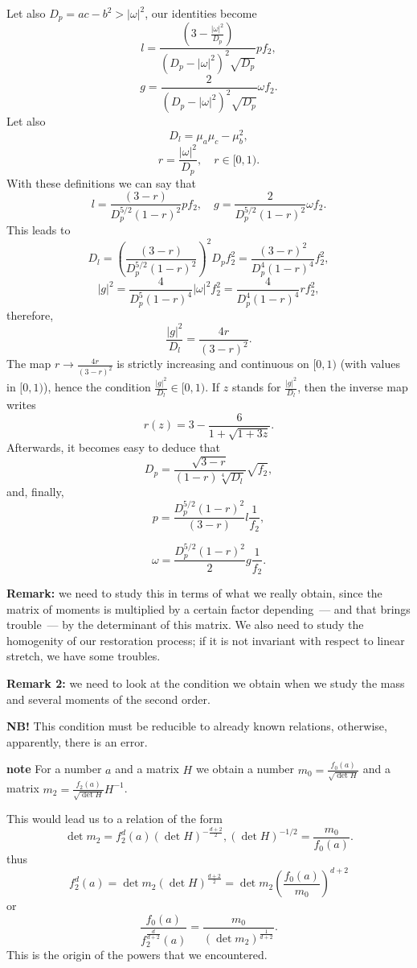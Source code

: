 Let also $D_p=ac-b^2>|\omega|^2$, our identities become
\[
    l = \frac{  \left(3-\frac{|\omega|^2}{D_p}\right)}{(D_p-|\omega|^2)^2\sqrt { D_p}}p f_2,
\]
\[
    g =  \frac{2 }{(D_p-|\omega|^2)^2\sqrt { D_p}}\omega f_2.
\]
Let also 
\[
    D_l = \mu_a \mu_c- \mu_b^2,
\]
\[
    r = \frac{|\omega|^2}{D_p},\quad  r\in[0,1) .
\]
With these definitions we can say that
\[
    l = \frac{ (3-r )}{D_p^{5/2}(1-r)^2}p f_2,
    \quad g = \frac{2 }{D_p^{5/2}(1-r)^2}\omega f_2.
\]
This leads to
\[
    D_l = \left( \frac{ (3-r )} {D_p^{5/2}(1-r)^2}\right)^2 D_p  f_2^2= 
       \frac{ (3-r )^2} {D_p^{4}(1-r)^4}  f_2^2, 
\]
\[
    |g|^2 = \frac{4 }{D_p^{5 }(1-r)^4}|\omega|^2 f_2^2=
    \frac{4 }{D_p^{4 }(1-r)^4}r f_2^2,
\]
therefore,
\[
    \frac{|g|^2}{D_l}=\frac{4r}{(3-r )^2}.
\]
The map $r\to\frac{4r}{(3-r )^2} $ is strictly increasing and continuous on $[0,1)$ (with values in $[0,1)$), hence the condition $ \frac{|g|^2}{D_l}\in[0,1)$. If $z$ stands for $\frac{|g|^2}{D_l}$, then the inverse map writes
\[
    r(z)=3 - \frac{6}{1+\sqrt{1+3z}}.
\]
Afterwards, it becomes easy to deduce that
\[
    D_p = \frac{\sqrt{3-r}}{(1-r)\sqrt[4]{D_l}} \sqrt{f_2},
\]
and, finally,
\[
    p = \frac{D_p^{5/2}(1-r)^2}{ (3-r )}l\frac{1}{f_2},
\]

\[
    \omega = \frac{D_p^{5/2}(1-r)^2}{2 }g\frac{1}{f_2}.
\]


\textbf{Remark:} we need to study this in terms of what we really obtain, since the matrix of moments is multiplied by a certain factor depending~--- and that brings trouble~--- by the determinant of this matrix. We also need to study the homogenity of our restoration process; if it is not invariant with respect to linear stretch, we have some troubles.

\textbf{Remark 2:} we need to look at the condition we obtain when we study the mass and several moments of the second order.

\textbf{NB!} This condition must be reducible to already known relations, otherwise, apparently, there is an error.

\textbf{note}
For a number $a$ and a matrix $H$ we obtain a number $m_0=\frac{f_0(a)}{\sqrt{\det H}}$ and a matrix $m_2 = \frac{f_2(a)}{\sqrt{\det H}}H^{-1}$.

This would lead us to a relation of the form
\[
        \det m_2  = f_2^{d}(a)(\det H)^{-\frac{d+2}{2}}, (\det H)^{-1/2} = \frac{m_0}{f_0(a)}.
\]
thus
\[
        f_2^{d}(a) = \det m_2 (\det H)^{\frac{d+2}{2}} = \det m_2 \left( \frac{f_0(a)}{m_0} \right)^{d+2}
\]
or
\[
        \frac{f_0(a)}{f_2^{\frac{d}{d+2}}(a)} = \frac{m_0}{(\det m_2)^{\frac{1}{d+2}}}.
\]
This is the origin %
of the powers that we encountered. 


